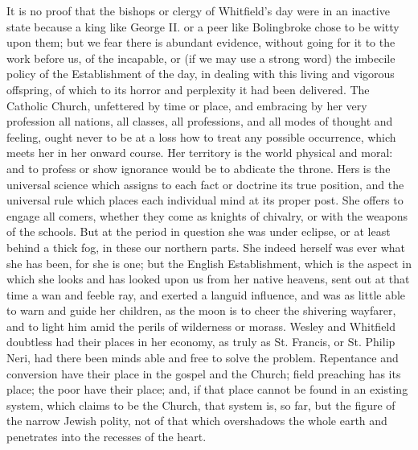 It is no proof that the bishops or clergy of
Whitfield's day were in an inactive state because a king like George
II. or a peer like Bolingbroke chose to be witty upon them; but we
fear there is abundant evidence, without going for it to the work
before us, of the incapable, or (if we may use a strong word) the
imbecile policy of the Establishment of the day, in dealing with this
living and vigorous offspring, of which to its horror and perplexity
it had been delivered. The Catholic Church, unfettered by time
or place, and embracing by her very profession all nations, all
classes, all professions, and all modes of thought and feeling, ought
never to be at a loss how to treat any possible occurrence, which
meets her in her onward course. Her territory is the world physical
and moral: and to profess or show ignorance would be to abdicate the
throne. Hers is the universal science which assigns to each fact or
doctrine its true position, and the universal rule which places each
individual mind at its proper post. She offers to engage all comers,
whether they come as knights of chivalry, or with the weapons of the
schools. But at the period in question she was under eclipse, or at
least behind a thick fog, in these our northern parts. She indeed
herself was ever what she has been, for she is one; but the English
Establishment, which is the aspect in which she looks and has looked
upon us from her native heavens, sent out at that time a wan and
feeble ray, and exerted a languid influence, and was as little able to
warn and guide her children, as the moon is to cheer the shivering
wayfarer, and to light him amid the perils of wilderness or morass.
Wesley and Whitfield doubtless had their places in her economy, as
truly as St. Francis, or St. Philip Neri, had there been minds able
and free to solve the problem. Repentance and conversion have their
place in the gospel and the Church; field preaching has its place; the
poor have their place; and, if that place cannot be found in an
existing system, which claims to be the Church, that system is, so
far, but the figure of the narrow Jewish polity, not of that which
overshadows the whole earth and penetrates into the recesses of the
heart.

